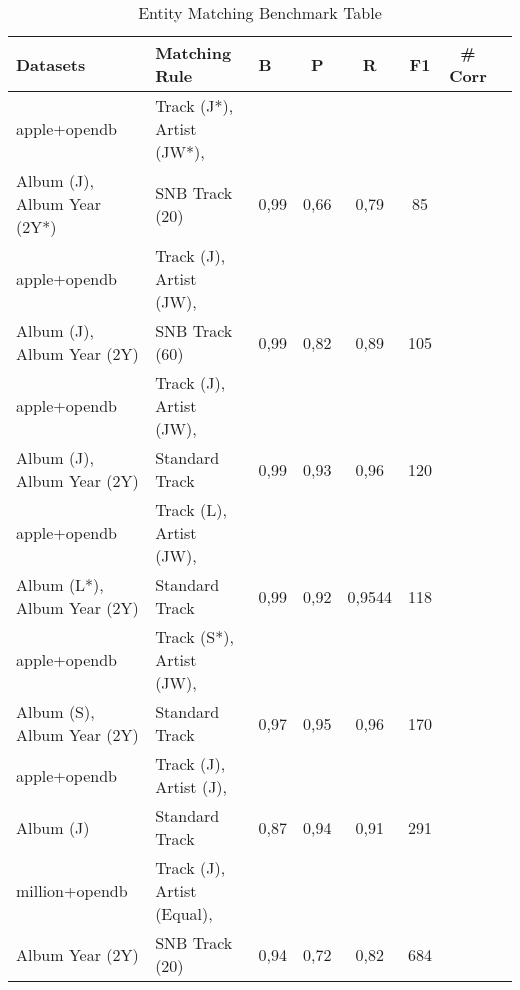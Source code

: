 \documentclass[runningheads]{llncs}
\begin{document}
\begin{table}[]
	\small
	\caption{Entity Matching Benchmark Table}
	\label{tab:benchmark}
	\begin{threeparttable}
	\begin{tabular}{lp{4.5cm}p{2cm}ccccc}
		\hline
		\textbf{Datasets}      & \textbf{Matching Rule}                                          & \textbf{B}                          & \textbf{P} & \textbf{R} & \textbf{F1}  & \textbf{\# Corr}  \\\hline
		apple+opendb         & \raggedright Track (J*), Artist (JW*), \\ Album (J), Album Year (2Y*) & \raggedright SNB Track (20)              & 0,99              & 0,66          & 0,79       & 85               \\
		apple+opendb         & \raggedright Track (J), Artist (JW), \\ Album (J), Album Year (2Y) & \raggedright SNB Track (60)              & 0,99             & 0,82          & 0,89       & 105              \\
		\rowcolor[HTML]{FFFFCC} 
		apple+opendb         & \raggedright Track (J), Artist (JW), \\ Album (J), Album Year (2Y) & \raggedright Standard Track                            & 0,99             & 0,93          & 0,96       & 120              \\
		apple+opendb         & \raggedright Track (L), Artist (JW), \\ Album (L*), Album Year (2Y) & \raggedright Standard Track                            & 0,99             & 0,92           & 0,9544       & 118              \\
		apple+opendb         & \raggedright Track (S*), Artist (JW),\\  Album (S), Album Year (2Y) & \raggedright Standard Track                            & 0,97             & 0,95          & 0,96       & 170              \\
		apple+opendb         & \raggedright Track (J), Artist (J),\\  Album (J)             & \raggedright Standard Track                            & 0,87             & 0,94          & 0,91       & 291              \\ \hline\hline
		million+opendb       & \raggedright Track (J), Artist (Equal), \\ Album Year (2Y)           & \raggedright SNB Track (20)              & 0,94             & 0,72         & 0,82       & 684              \\

\end{tabular}
\end{threeparttable}
\end{table}
\end{document}
